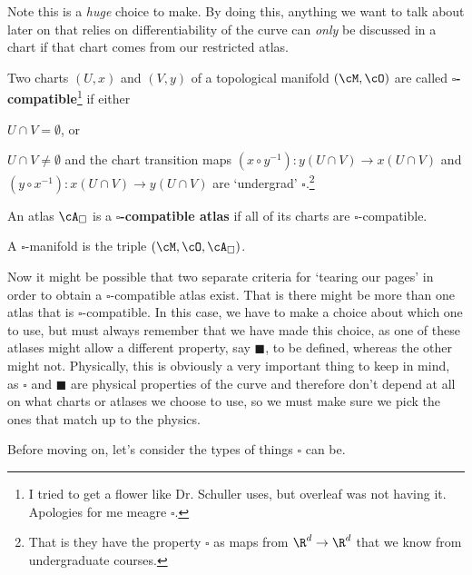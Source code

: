 Note this is a \textit{huge} choice to make. By doing this, anything we want to talk about later on that relies on differentiability of the curve can \textit{only} be discussed in a chart if that chart comes from our restricted atlas. 

    Two charts $(U,x)$ and $(V,y)$ of a topological manifold $(\cM,\cO)$ are called \textbf{$\square$-compatible}\footnote{I tried to get a flower like Dr. Schuller uses, but overleaf was not having it. Apologies for me meagre $\square$.} if either
    \ben[label=(\alph*)] 
        \item $U\cap V =\emptyset$, or 
        \item $U\cap V \neq \emptyset$ and the chart transition maps $(x\circ y^{-1}):y(U\cap V) \to x(U\cap V)$ and $(y\circ x^{-1}):x(U\cap V) \to y(U\cap V)$ are `undergrad' $\square$.\footnote{That is they have the property $\square$ as maps from $\R^d\to \R^d$ that we know from undergraduate courses.}
    \een 
\ed 

    An atlas $\cA_{\square}$ is a \textbf{$\square$-compatible atlas} if all of its charts are $\square$-compatible.
\ed 

\bd[]
    A $\square$-manifold is the triple $(\cM,\cO,\cA_{\square})$.
\ed 

Now it might be possible that two separate criteria for `tearing our pages' in order to obtain a $\square$-compatible atlas exist. That is there might be more than one atlas that is $\square$-compatible. In this case, we have to make a choice about which one to use, but must always remember that we have made this choice, as one of these atlases might allow a different property, say $\blacksquare$, to be defined, whereas the other might not. Physically, this is obviously a very important thing to keep in mind, as $\square$ and $\blacksquare$ are physical properties of the curve and therefore don't depend at all on what charts or atlases we choose to use, so we must make sure we pick the ones that match up to the physics. 

Before moving on, let's consider the types of things $\square$ can be. 

